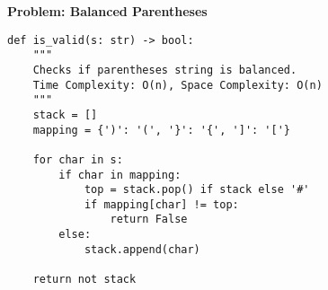 % 
% 
\noindent\textbf{Problem: Balanced Parentheses}
\begin{verbatim}
def is_valid(s: str) -> bool:
    """
    Checks if parentheses string is balanced.
    Time Complexity: O(n), Space Complexity: O(n)
    """
    stack = []
    mapping = {')': '(', '}': '{', ']': '['}
    
    for char in s:
        if char in mapping:
            top = stack.pop() if stack else '#'
            if mapping[char] != top:
                return False
        else:
            stack.append(char)
    
    return not stack
\end{verbatim}

